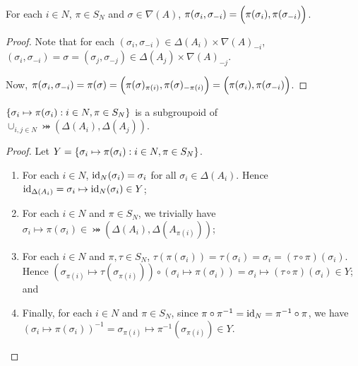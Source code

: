 \begin{proposition}
	For each $i \in N$, $\pi \in S_N$ and $\sigma \in \nabla(A)$, $\pi(\sigma_i, \sigma_{-i}) = \Bigl(\pi(\sigma_i), \pi(\sigma_{-i})\Bigr)$.
	
	\begin{proof}
		Note that for each $(\sigma_i, \sigma_{-i}) \in \Delta(A_i)\times{\nabla(A)}_{-i}$, $(\sigma_i, \sigma_{-i}) = \sigma = (\sigma_j, \sigma_{-j}) \in \Delta(A_j)\times{\nabla(A)}_{-j}$.
		
		Now, $\pi(\sigma_i, \sigma_{-i}) = \pi(\sigma) = \Bigl(\pi(\sigma)_{\pi(i)}, \pi(\sigma)_{-\pi(i)}\Bigr) = \Bigl(\pi(\sigma_i), \pi(\sigma_{-i})\Bigr)$.
	\end{proof}
\end{proposition}

\begin{proposition} \label{prop:firstgroupoidprop}
	$\left\{\sigma_i \mapsto \pi(\sigma_i): i \in N, \pi \in S_N\right\}$ is a subgroupoid of $\cup_{i, j \in N}\bij(\Delta(A_i), \Delta(A_j))$.
	
	\begin{proof}		
		Let $Y = \left\{\sigma_i \mapsto \pi(\sigma_i): i \in N, \pi \in S_N\right\}$.
		
		\begin{enumerate}
			\item For each $i \in N$, $\text{id}_N(\sigma_i) = \sigma_i$ for all $\sigma_i \in \Delta(A_i)$. Hence $\text{id}_{\Delta(A_i)} = \sigma_i \mapsto \text{id}_N(\sigma_i) \in Y$;
			\item For each $i \in N$ and $\pi \in S_N$, we trivially have $\sigma_i \mapsto \pi(\sigma_i) \in \bij(\Delta(A_i), \Delta(A_{\pi(i)}))$;
			\item For each $i \in N$ and $\pi, \tau \in S_N$, $\tau(\pi(\sigma_i)) = \tau(\sigma_i) = \sigma_i = (\tau \circ \pi)(\sigma_i)$. Hence $(\sigma_{\pi(i)} \mapsto \tau(\sigma_{\pi(i)})) \circ (\sigma_i \mapsto \pi(\sigma_i)) = \sigma_i \mapsto (\tau \circ \pi)(\sigma_i) \in Y$; and
			\item Finally, for each $i \in N$ and $\pi \in S_N$, since $\pi \circ \pi^{-1} = \text{id}_N = \pi^{-1} \circ \pi$, we have $(\sigma_i \mapsto \pi(\sigma_i))^{-1} = \sigma_{\pi(i)} \mapsto \pi^{-1}(\sigma_{\pi(i)}) \in Y$.
		\end{enumerate} \vspace{-0.8cm}
	\end{proof}
\end{proposition}


